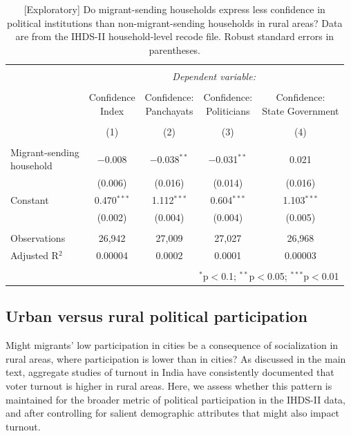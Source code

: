 \documentclass[
  11.5pt,
]{article}
\begin{document}
\begin{table}[!htbp] \centering 
  \caption{[Exploratory] Do migrant-sending households express less confidence in political institutions than non-migrant-sending households in rural areas? Data are from the IHDS-II household-level recode file. Robust standard errors in parentheses.} 
  \label{tab:ihds2_confidence_rural} 
\small 
\begin{tabular}{@{\extracolsep{5pt}}lcccc} 
\\[-1.8ex]\hline 
\hline \\[-1.8ex] 
 & \multicolumn{4}{c}{\textit{Dependent variable:}} \\ 
\cline{2-5} 
\\[-1.8ex] & \shortstack{Confidence \\ Index} & \shortstack{Confidence: \\ Panchayats} & \shortstack{Confidence: \\ Politicians} & \shortstack{Confidence: \\ State Government} \\ 
\\[-1.8ex] & (1) & (2) & (3) & (4)\\ 
\hline \\[-1.8ex] 
 \shortstack{Migrant-sending \\ household} & $-$0.008 & $-$0.038$^{**}$ & $-$0.031$^{**}$ & 0.021 \\ 
  & (0.006) & (0.016) & (0.014) & (0.016) \\ 
  Constant & 0.470$^{***}$ & 1.112$^{***}$ & 0.604$^{***}$ & 1.103$^{***}$ \\ 
  & (0.002) & (0.004) & (0.004) & (0.005) \\ 
 \hline \\[-1.8ex] 
Observations & 26,942 & 27,009 & 27,027 & 26,968 \\ 
Adjusted R$^{2}$ & 0.00004 & 0.0002 & 0.0001 & 0.00003 \\ 
\hline 
\hline \\[-1.8ex] 
\multicolumn{5}{r}{$^{*}$p$<$0.1; $^{**}$p$<$0.05; $^{***}$p$<$0.01} \\ 
\end{tabular} 
\end{table}

\subsection{Urban versus rural political participation}

Might migrants' low participation in cities be a consequence of
socialization in rural areas, where participation is lower than in
cities? As discussed in the main text, aggregate studies of turnout in
India have consistently documented that voter turnout is higher in rural
areas. Here, we assess whether this pattern is maintained for the
broader metric of political participation in the IHDS-II data, and after
controlling for salient demographic attributes that might also impact
turnout.
\end{document}
